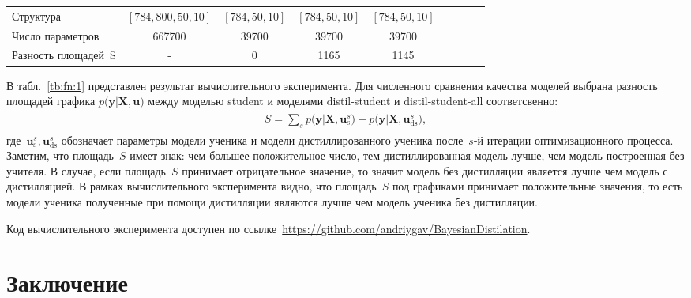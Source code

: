 \documentclass[12pt]{a&t}
\begin{document}
\begin{table}[]
\begin{center}
\begin{tabular}{|l|c|c|c|c|llll}
Структура           & $[784,800,50,10]$& $[784,50,10]$   & $[784,50,10]$  & $[784,50,10]$      &                      &                      &                      &                      \\ \cline{1-5}
Число параметров    &           667700                  &          39700                &         39700                &                 39700            &                      &                      &                      &                      \\ \cline{1-5}
Разность площадей~S   & -                           & 0                       &  1165               & 1145                    &                      &                      &                      &                      \\ \cline{1-5}
\end{tabular}
\end{center}
\end{table}

В табл.~\ref{tb:fn:1} представлен результат вычислительного эксперимента. Для численного сравнения качества моделей выбрана разность площадей графика $p\bigr(\mathbf{y}|\mathbf{X}, \mathbf{u}\bigr)$ между моделью student и моделями distil-student  и 
distil-student-all соответсвенно:
\begin{gather}
\label{eq:ex:8}
\begin{aligned}
S = \sum_{s} p\bigr(\mathbf{y}|\mathbf{X}, \mathbf{u}^s_{\text{s}}\bigr) - p\bigr(\mathbf{y}|\mathbf{X}, \mathbf{u}^s_{\text{ds}}\bigr),
\end{aligned}
\end{gather}
где~$\mathbf{u}^s_{\text{s}}, \mathbf{u}^s_{\text{ds}}$ обозначает параметры модели ученика и модели дистиллированного ученика после~$s$-й итерации оптимизационного процесса. Заметим, что площадь~$S$ имеет знак: чем большее положительное число, тем дистиллированная модель лучше, чем модель построенная без учителя. В случае, если площадь~$S$ принимает отрицательное значение, то значит модель без дистилляции является лучше чем модель с дистилляцией. В рамках вычислительного эксперимента видно, что площадь~$S$ под графиками принимает положительные значения, то есть модели ученика полученные при помощи дистилляции являются лучше чем модель ученика без дистилляции.

Код вычислительного эксперимента доступен по ссылке~\url{https://github.com/andriygav/BayesianDistilation}.

\section{Заключение}
\end{document}
